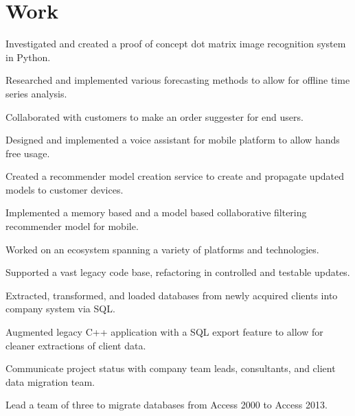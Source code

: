 \documentclass{playground}
\begin{document}
	\section{Work}
			\resumesublistbegin
				\item {}
					\resumesublistbegin
						\item Investigated and created a proof of concept dot matrix image recognition system in Python.
						\item Researched and implemented various forecasting methods to allow for offline time series analysis.
						\item Collaborated with customers to make an order suggester for end users.
						\item Designed and implemented a voice assistant for mobile platform to allow hands free usage. 
						\item Created a recommender model creation service to create and propagate updated models to customer devices.
						\item Implemented a memory based and a model based collaborative filtering recommender model for mobile.
						\item Worked on an ecosystem spanning a variety of platforms and technologies.
						\item Supported a vast legacy code base, refactoring in controlled and testable updates.
					\resumesublistend
				\item {}
					\resumesublistbegin
						\item Extracted, transformed, and loaded databases from newly acquired clients into company system via SQL.
						\item Augmented legacy C++ application with a SQL export feature to allow for cleaner extractions of client data.
						\item Communicate project status with company team leads, consultants, and client data migration team.
					\resumesublistend
			\resumesublistend
			\resumesublistbegin
				\item {}
					\resumesublistbegin
						\item Lead a team of three to migrate databases from Access 2000 to Access 2013.
\end{document}

